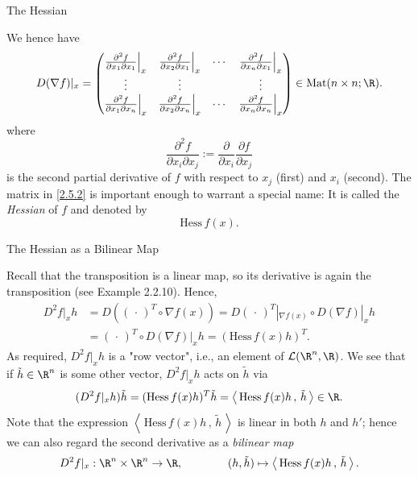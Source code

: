 \documentclass[smaller,hyperref={CJKbookmarks=true}]{beamer}
\newcommand{\scp}[2]{\left\langle\,#1\,,\,#2\,\right\rangle} \newcommand{\scpp}{\langle\,\cdot\,,\,\cdot\,\rangle}
\begin{document}
\begin{frame}[t]{The Hessian}
\begin{spacing}{1}
We hence have
\begin{equation}\label{2.5.2}
D(\nabla f)|_x=\begin{pmatrix}
                   \frac{\partial^2 f}{\partial x_1\partial x_1}\Big|_x & \frac{\partial^2 f}{\partial x_2\partial x_1}\Big|_x & \cdots & \frac{\partial^2 f}{\partial x_n\partial x_1}\Big|_x \\
                   \vdots & \vdots & & \vdots \\
                   \frac{\partial^2 f}{\partial x_1\partial x_n}\Big|_x & \frac{\partial^2 f}{\partial x_2\partial x_n}\Big|_x & \cdots & \frac{\partial^2 f}{\partial x_n\partial x_n}\Big|_x
                 \end{pmatrix}\in\text{Mat}(n\times n;\R).
\end{equation}
where
\[\frac{\partial^2f}{\partial x_i\partial x_j}:=\frac{\partial}{\partial x_i}
\frac{\partial f}{\partial x_j}\]
is the second partial derivative of $f$ with respect to $x_j$ (first) and $x_i$ (second). The matrix in \eqref{2.5.2} is important enough to warrant a special name: It is called the \emph{Hessian} of $f$ and denoted by
\vspace*{8pt}
\[\text{Hess}\,f(x).\]
\end{spacing}
\end{frame}
\begin{frame}[t]{The Hessian as a Bilinear Map}
\begin{spacing}{1}
Recall that the transposition is a linear map, so its derivative is again the
transposition (see Example 2.2.10). Hence,
\begin{equation}\label{2.5.3}
  \begin{aligned}
    D^2f|_xh&=D((\,\cdot\,)^T\circ\nabla f(x))=D(\,\cdot\,)^T|_{\nabla f(x)}\circ D(\nabla f)|_xh\\
    &=(\,\cdot\,)^T\circ D(\nabla f)|_xh=(\text{Hess}\,f(x)h)^T.
  \end{aligned}
\end{equation}
As required, $D^2f|_xh$ is a "row vector", i.e., an element of $\mathcal{L}(\R^n,\R)$. We see that if $\tilde{h}\in\R^n$ is some other vector, $D^2f|_xh$ acts on $\tilde{h}$ via
\[(D^2f|_xh)\tilde{h}=(\text{Hess}\,f(x)h)^T\tilde{h}
=\scp{\text{Hess}\,f(x)h}{\tilde{h}}\in\R.\]
Note that the expression $\scp{\text{Hess}\,f(x)h}{\tilde{h}}$ is linear in both $h$ and $h'$; hence we can also regard the second derivative as a \emph{bilinear map}
\[D^2f|_x:\R^n\times\R^n\to\R,\qquad\qquad
(h,\tilde{h})\mapsto\scp{\text{Hess}\,f(x)h}{\tilde{h}}.\]
\end{spacing}
\end{frame}
\end{document}

